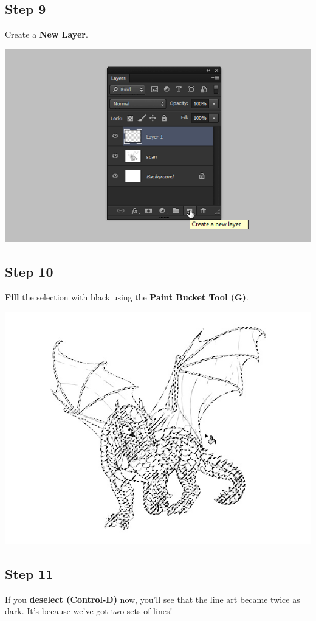 \subsection{Step 9}
Create a \textbf{New Layer}.

\begin{center}
\includegraphics[width=0.7\linewidth]{Photos/quick-lineart-new-layer}
\end{center}

\subsection{Step 10}
\textbf{Fill} the selection with black using the \textbf{Paint Bucket Tool (G)}.

\begin{center}
\includegraphics[width=0.7\linewidth]{Photos/quick-lineart-fill}
\end{center}

\subsection{Step 11}
If you \textbf{deselect (Control-D)} now, you'll see that the line art became twice as dark. It's because we've got two sets of lines!

